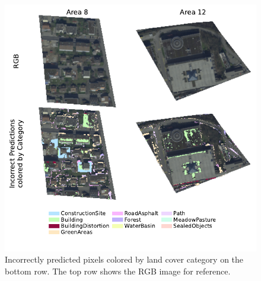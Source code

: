 \begin{figure}[H]
    \centering
    \captionsetup{width=0.8\linewidth}
    \includegraphics{figures/incorrect_per_category.pdf}
    \caption{Incorrectly predicted pixels colored by land cover category on the bottom row. The top row shows the RGB image for reference.}
    \label{fig:incorrect_per_category}
\end{figure}